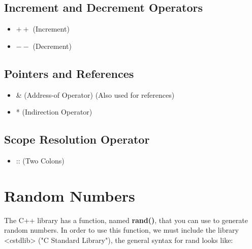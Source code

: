 \documentclass{report}
\begin{document}
    \begin{minipage}[t]{0.47\textwidth}
        \subsection{Increment and Decrement Operators}
        \begin{itemize}
          \item \( ++ \) (Increment)
          \item \( -- \) (Decrement)
        \end{itemize}
        \subsection{Pointers and References}
        \begin{itemize}
            \item \& (Address-of Operator) (Also used for references)
            \item * (Indirection Operator)
        \end{itemize}
    \end{minipage}
    \bigbreak \noindent 
    \begin{minipage}[]{0.47\textwidth}
        \subsection{Scope Resolution Operator}
        \begin{itemize}
            \item :: (Two Colons)
        \end{itemize}
    
    \end{minipage}


    \bigbreak \noindent 

    \pagebreak \bigbreak \noindent 
    \section{\LARGE Random Numbers}
    \bigbreak \noindent 
    The C++ library has a function, named \textbf{rand()}, that you can use to generate random numbers. In order to use this function, we must include the library <cstdlib> ("C Standard Library"), the general syntax for rand looks like:
    \smallbreak \noindent
    
\end{document}

